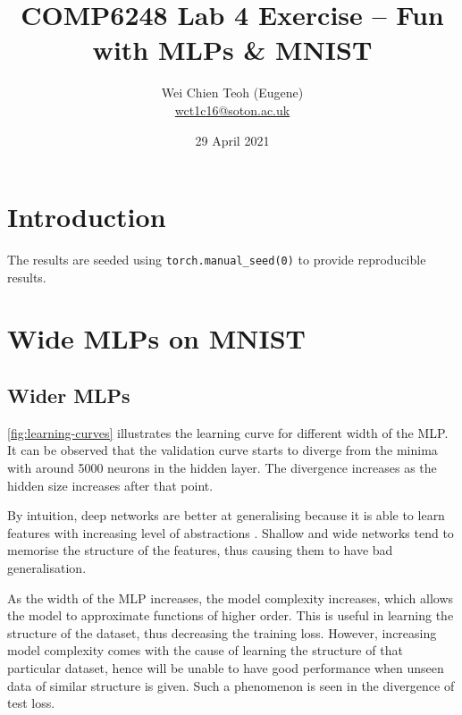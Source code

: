 \documentclass[twocolumn]{article}
\title{\Large COMP6248 Lab 4 Exercise -- Fun with MLPs \& MNIST}
\author{\small Wei Chien Teoh (Eugene)\\\bigskip \href{mailto:wct1c16@soton.ac.uk}{wct1c16@soton.ac.uk}}
\date{\small 29 April 2021}
\begin{document}
\maketitle

\section*{Introduction}

The results are seeded using \lstinline{torch.manual_seed(0)} to provide reproducible results.

\section{Wide MLPs on MNIST}

\subsection{Wider MLPs}

\cref{fig:learning-curves} illustrates the learning curve for different width of the MLP. It can be observed that the validation curve starts to diverge from the minima with around 5000 neurons in the hidden layer. The divergence increases as the hidden size increases after that point.

By intuition, deep networks are better at generalising because it is able to learn features with increasing level of abstractions \autocite{eldanPowerDepthFeedforward2016}. Shallow and wide networks tend to memorise the structure of the features, thus causing them to have bad generalisation.

As the width of the MLP increases, the model complexity increases, which allows the model to approximate functions of higher order. This is useful in learning the structure of the dataset, thus decreasing the training loss. However, increasing model complexity comes with the cause of learning the structure of that particular dataset, hence will be unable to have good performance when unseen data of similar structure is given. Such a phenomenon is seen in the divergence of test loss.
\end{document}
